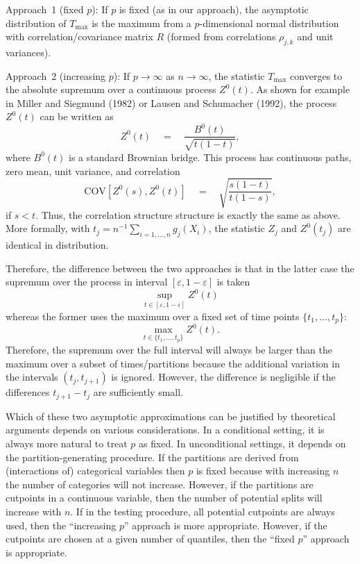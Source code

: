 \documentclass[11pt,a4paper]{article}
\begin{document}
\begin{enumerate}
	Approach~1 (fixed $p$): If $p$ is fixed (as in our approach), the asymptotic
	distribution of $T_{\max}$ is the maximum from a $p$-dimensional normal
	distribution with correlation/covariance matrix $R$ (formed from correlations
	$\rho_{j, k}$ and unit variances).
	
	Approach~2 (increasing $p$): If $p \rightarrow \infty$ as $n \rightarrow \infty$,
	the statistic $T_{\max}$ converges to the absolute supremum over a continuous process
	$Z^0(t)$. As shown for example in Miller and Siegmund (1982) or
	Lausen and Schumacher (1992), the process $Z^0(t)$ can be written as
	  \[ Z^0(t) \quad = \quad \frac{B^0(t)}{\sqrt{t (1 - t)}}, \]
	where $B^0(t)$ is a standard Brownian bridge. This process has continuous paths,
	zero mean, unit variance, and correlation
	  \[ \mbox{COV}[Z^0(s), Z^0(t)] \quad = \quad \sqrt{\frac{s (1 - t)}{t (1 - s)}}, \]
	if $s < t$. Thus, the correlation structure structure is exactly the same as
	above. More formally, with $t_j = n^{-1} \sum_{i = 1, \dots, n} g_j(X_i)$,
	the statistic $Z_j$ and $Z^0(t_j)$ are identical in distribution.
	
	Therefore, the difference between the two approaches is that in the latter case
	the supremum over the process in interval $[\varepsilon, 1 - \varepsilon]$ is taken
	  \[ \sup_{t \in [\varepsilon, 1 - \varepsilon]} Z^0(t) \]
	whereas the former uses the maximum over a fixed set of time points
	$\{t_1, \dots, t_p\}$:	
	  \[ \max_{t \in \{t_1, \dots, t_p\}} Z^0(t). \]
	Therefore, the supremum over the full interval will always be larger than the 
	maximum over a subset of times/partitions because the additional variation
	in the intervals $(t_j, t_{j + 1})$ is ignored. However, the difference is negligible
	if the differences $t_{j+1} - t_j$ are sufficiently small.
	
	Which of these two asymptotic approximations can be justified by theoretical arguments
	depends on various considerations. In a conditional setting, it is always more natural
	to treat $p$ as fixed. In unconditional settings, it depends on the partition-generating
	procedure. If the partitions are derived from (interactions of) categorical variables
	then $p$ is fixed because with increasing $n$ the number of categories will not increase.
	However, if the partitions are cutpoints in a continuous variable, then the number
	of potential splits will increase with $n$. If in the testing procedure, all potential
	cutpoints are always used, then the ``increasing $p$'' approach is more appropriate.
	However, if the cutpoints are chosen at a given number of quantiles, then the ``fixed $p$''
	approach is appropriate.
	

\end{enumerate}
\end{document}

